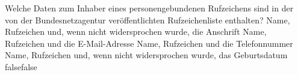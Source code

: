     {Welche Daten zum Inhaber eines personengebundenen Rufzeichens sind in der von der Bundesnetzagentur veröffentlichten Rufzeichenliste enthalten?}
    {Name, Rufzeichen und, wenn nicht widersprochen wurde, die Anschrift}
    {Name, Rufzeichen und die E-Mail-Adresse}
    {Name, Rufzeichen und die Telefonnummer}
    {Name, Rufzeichen und, wenn nicht widersprochen wurde, das Geburtsdatum}
    {false}{false}